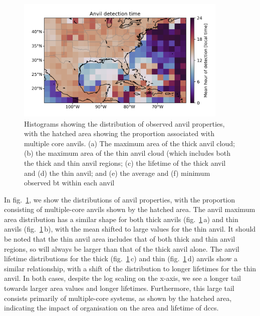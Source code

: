 \begin{figure}[tp]
    \centering
    \includegraphics[width=0.9\textwidth]{figures/chapter2_23.png}
    \caption[
    The distribution of observed anvil properties
    ]{
    Histograms showing the distribution of observed anvil properties, with the hatched area showing the proportion associated with multiple core anvils. (a) The maximum area of the thick anvil cloud; (b) the maximum area of the thin anvil cloud (which includes both the thick and thin anvil regions; (c) the lifetime of the thick anvil and (d) the thin anvil; and (e) the average and (f) minimum observed \acrshort{bt} within each anvil
    }
    \label{fig:anvil_properties}
\end{figure}

In fig.~\ref{fig:anvil_properties}, we show the distributions of anvil properties, with the proportion consisting of multiple-core anvils shown by the hatched area.
The anvil maximum area distribution has a similar shape for both thick anvils (fig.~\ref{fig:anvil_properties}\,a) and thin anvils (fig.~\ref{fig:anvil_properties}\,b), with the mean shifted to large values for the thin anvil.
It should be noted that the thin anvil area includes that of both thick and thin anvil regions, so will always be larger than that of the thick anvil alone.
The anvil lifetime distributions for the thick (fig.~\ref{fig:anvil_properties}\,c) and thin (fig.~\ref{fig:anvil_properties}\,d) anvils show a similar relationship, with a shift of the distribution to longer lifetimes for the thin anvil.
In both cases, despite the log scaling on the x-axis, we see a longer tail towards larger area values and longer lifetimes.
Furthermore, this large tail consists primarily of multiple-core systems, as shown by the hatched area, indicating the impact of organisation on the area and lifetime of \acrshort{dcc}s.

